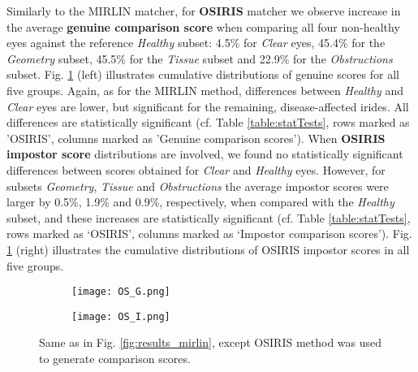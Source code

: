 \documentclass[conference]{IEEEtran}
\begin{document}
Similarly to the MIRLIN matcher, for {\bf OSIRIS} matcher we observe increase in the average {\bf genuine comparison score} when comparing all four non-healthy eyes against the reference \emph{Healthy} subset: 4.5\% for \emph{Clear} eyes, 45.4\% for the \emph{Geometry} subset, 45.5\% for the \emph{Tissue} subset and 22.9\% for the \emph{Obstructions} subset. Fig. \ref{fig:results_osiris} (left) illustrates cumulative distributions of genuine scores for all five groups. Again, as for the MIRLIN method, differences between \emph{Healthy} and \emph{Clear} eyes are lower, but significant for the remaining, disease-affected irides. All differences are statistically significant (cf. Table \ref{table:statTests}, rows marked as 'OSIRIS', columns marked as 'Genuine comparison scores'). When {\bf OSIRIS impostor score} distributions are involved, we found no statistically significant differences between scores obtained for \emph{Clear} and \emph{Healthy} eyes. However, for subsets \emph{Geometry}, \emph{Tissue} and \emph{Obstructions} the average impostor scores were larger by 0.5\%, 1.9\% and 0.9\%, respectively, when compared with the \emph{Healthy} subset, and these increases are statistically significant (cf. Table \ref{table:statTests}, rows marked as `OSIRIS', columns marked as `Impostor comparison scores'). Fig. \ref{fig:results_osiris} (right) illustrates the cumulative distributions of OSIRIS impostor scores in all five groups. 


\begin{figure}[!htb]
\centering
\begin{subfigure}{0.25\textwidth}
  \centering
  \texttt{[image: OS\_G.png]}
\end{subfigure}%
\begin{subfigure}{0.25\textwidth}
  \centering
  \texttt{[image: OS\_I.png]}
\end{subfigure}
\caption{Same as in Fig. \ref{fig:results_mirlin}, except OSIRIS method was used to generate comparison scores.}
\label{fig:results_osiris}
\end{figure} 
\end{document}
